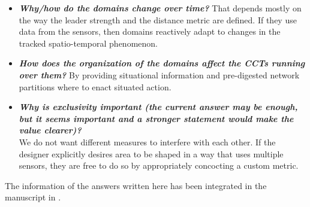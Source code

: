 \documentclass{article}
\newcommand{\revq}[1]{{\emph{\textbf{#1}}}}
\begin{document}
{\begin{itemize}
\\
The developer can influence the selection of the leading node,
the metric space,
and the accumulation function.
%
\item \revq{Why/how do the domains change over time?}
That depends mostly on the way the leader strength and the distance metric are defined.
If they use data from the sensors,
then domains reactively adapt to changes in the tracked spatio-temporal phenomenon.
%
\item \revq{How does the organization of the domains affect the CCTs running over them?}
By providing situational information and pre-digested network partitions
where to enact situated action.
%
\item \revq{Why is exclusivity important (the current answer may be enough, but it seems important and a stronger statement would make the value clearer)?}
\\
We do not want different measures to interfere with each other.
If the designer explicitly desires area to be shaped in a way that uses multiple sensors,
they are free to do so by appropriately concocting a custom metric.
\end{itemize}

The information of the answers written here has been integrated in the manuscript in .
}
\end{document}
